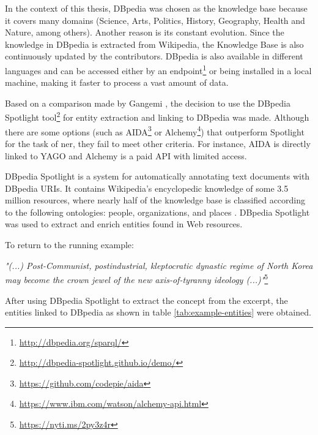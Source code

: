 In the context of this thesis, DBpedia was chosen as the knowledge base because it covers many domains (Science, Arts, Politics, History, Geography, Health and Nature, among others). Another reason is its constant evolution. Since the knowledge in DBpedia is extracted from Wikipedia,  the Knowledge Base is also continuously updated by the contributors. DBpedia is also available in different languages and can be accessed either by an endpoint\footnote{\url{http://dbpedia.org/sparql/}} or being installed in a local machine, making it faster to process a vast amount of data.

Based on a comparison made by Gangemi \cite{gangemi2013comparison}, the decision to use the DBpedia Spotlight  tool\footnote{\url{http://dbpedia-spotlight.github.io/demo/}} for entity extraction and linking to DBpedia was made. Although there are some options (such as AIDA\footnote{\url{https://github.com/codepie/aida}} or Alchemy\footnote{\url{https://www.ibm.com/watson/alchemy-api.html}}) that outperform Spotlight for the task of \gls{ner}, they fail to meet other criteria. For instance, AIDA is directly linked to YAGO and Alchemy is a paid API with limited access.  


DBpedia Spotlight is a system for automatically annotating text documents with DBpedia URIs. It contains Wikipedia's encyclopedic knowledge of some 3.5 million resources, where nearly half of the knowledge base is classified according to the following ontologies: people, organizations, and places \cite{Mendes:2011}. DBpedia Spotlight was used to extract and enrich entities found in Web resources.

To return to the running example:

\textit{"(...) Post-Communist, postindustrial, kleptocratic dynastic regime of North Korea may become the crown jewel of the new axis-of-tyranny ideology (...)"}\footnote{\url{https://nyti.ms/2py3z4r}} \

After using DBpedia Spotlight to extract the concept from the excerpt, the entities linked to DBpedia as shown in table \ref{tab:example-entities} were obtained.

